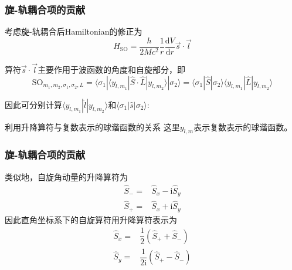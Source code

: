 {\frame
{
	\frametitle{旋-轨耦合项的贡献}
	考虑旋-轨耦合后\textrm{Hamiltonian}的修正为
	\begin{displaymath}
		H_{\mathrm{SO}}=\dfrac{h}{2Mc^2}\dfrac1{r}\dfrac{\mathrm{d}V}{\mathrm{d}r}\vec{s}\cdot\vec{l}
	\end{displaymath}

	算符$\vec{s}\cdot\vec{l}$主要作用于波函数的角度和自旋部分，即
\begin{displaymath}
	\mathrm{SO}_{m_1,m_2,\sigma_1,\sigma_2,L}=\langle\sigma_1|\langle y_{l,m_1}|\hat S\cdot\hat L|y_{l,m_2}\rangle|\sigma_2\rangle=\langle\sigma_1|\hat S|\sigma_2\rangle\langle y_{l,m_1}|\hat L|y_{l,m_2}\rangle
\end{displaymath}

因此可分别计算$\langle y_{l,m_1}|\hat l|y_{l,m_2}\rangle$和$\langle\sigma_1|\hat s|\sigma_2\rangle$:

利用升降算符与复数表示的球谐函数的关系
	{	\fontsize{8.2pt}{4.2pt}}
这里$y_{l,m}$表示复数表示的球谐函数。

}

\frame
{
	\frametitle{旋-轨耦合项的贡献}
类似地，自旋角动量的升降算符为
\begin{displaymath}
	\begin{aligned}
		\hat S_-=&\hat S_x-\mathrm{i}\hat S_y\\
		\hat S_+=&\hat S_x+\mathrm{i}\hat S_y
	\end{aligned}
\end{displaymath}
因此直角坐标系下的自旋算符用升降算符表示为
\begin{displaymath}
	\begin{aligned}
		\hat S_x=&\dfrac12(\hat S_++\hat S_-)\\
		\hat S_y=&\dfrac1{2\mathrm{i}}(\hat S_+-\hat S_-)
	\end{aligned}
\end{displaymath}

}}
